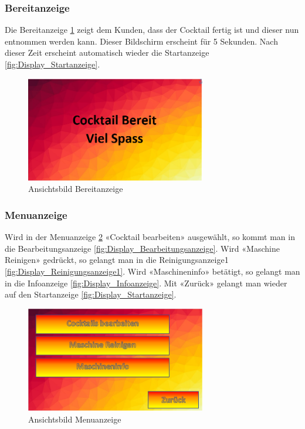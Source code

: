 \subsubsection{Bereitanzeige}\label{subsubsec:Display_Bereitanzeige}

Die Bereitanzeige \ref{fig:Display_Bereitanzeige} zeigt dem Kunden, dass der Cocktail fertig ist und dieser nun entnommen werden kann. Dieser Bildschirm erscheint für 5 Sekunden. Nach dieser Zeit erscheint automatisch wieder die Startanzeige \ref{fig:Display_Startanzeige}.

\begin{figure}[h!]
\centering
\includegraphics[width=0.7\textwidth]{graphics/Display_Bereitanzeige.png}
\caption{Ansichtsbild Bereitanzeige}
\label{fig:Display_Bereitanzeige}
\end{figure}

\subsubsection{Menuanzeige}\label{subsubsec:Display_Menuanzeige}

Wird in der Menuanzeige \ref{fig:Display_Menuanzeige} «Cocktail bearbeiten» ausgewählt, so kommt man in die Bearbeitungsanzeige \ref{fig:Display_Bearbeitungsanzeige}. Wird «Maschine Reinigen» gedrückt, so gelangt man in die Reinigungsanzeige1 \ref{fig:Display_Reinigungsanzeige1}. Wird «Maschineninfo» betätigt, so gelangt man in die Infoanzeige \ref{fig:Display_Infoanzeige}. Mit «Zurück» gelangt man wieder auf den Startanzeige \ref{fig:Display_Startanzeige}.

\begin{figure}[h!]
\centering
\includegraphics[width=0.7\textwidth]{graphics/Display_Menuanzeige.png}
\caption{Ansichtsbild Menuanzeige}
\label{fig:Display_Menuanzeige}
\end{figure}

